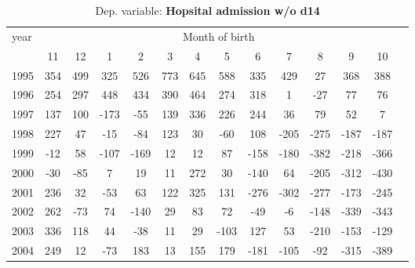  \begin{table}[H] \begin{threeparttable} \centering \caption{Dep. variable: \textbf{Hopsital admission w/o d14}} {\def\sym#1{\ifmmode^{#1}\else\(^{#1}\)\fi} \begin{tabular}{l*{13}{c}} \toprule year & \multicolumn{12}{c}{Month of birth} \\ \cmidrule(lr){2-13} 
            &          11&          12&           1&           2&           3&           4&           5&           6&           7&           8&           9&          10\\
1995        &         354&         499&         325&         526&         773&         645&         588&         335&         429&          27&         368&         388\\
1996        &         254&         297&         448&         434&         390&         464&         274&         318&           1&         -27&          77&          76\\
1997        &         137&         100&        -173&         -55&         139&         336&         226&         244&          36&          79&          52&           7\\
1998        &         227&          47&         -15&         -84&         123&          30&         -60&         108&        -205&        -275&        -187&        -187\\
1999        &         -12&          58&        -107&        -169&          12&          12&          87&        -158&        -180&        -382&        -218&        -366\\
2000        &         -30&         -85&           7&          19&          11&         272&          30&        -140&          64&        -205&        -312&        -430\\
2001        &         236&          32&         -53&          63&         122&         325&         131&        -276&        -302&        -277&        -173&        -245\\
2002        &         262&         -73&          74&        -140&          29&          83&          72&         -49&          -6&        -148&        -339&        -343\\
2003        &         336&         118&          44&         -38&          11&          29&        -103&         127&          53&        -210&        -153&        -129\\
2004        &         249&          12&         -73&         183&          13&         155&         179&        -181&        -105&         -92&        -315&        -389\\

\end{tabular}}
\end{threeparttable}
\end{table}
